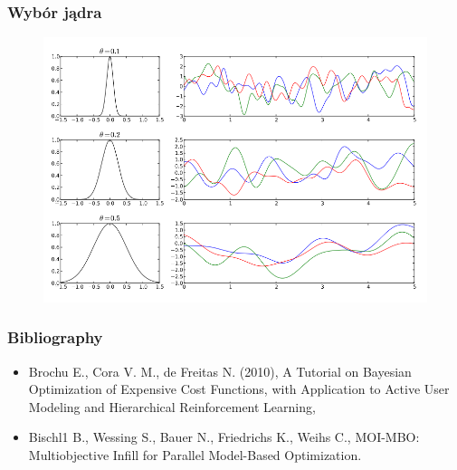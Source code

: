 \documentclass[handout]{beamer}
\begin{document}
\begin{frame}
\frametitle{Wybór jądra}
\begin{center}
\begin{figure}
\includegraphics[scale=0.45]{kern.png}
\end{figure}
\end{center}
\end{frame}

\begin{frame}
	\frametitle{Bibliography}
	\begin{itemize}
	    \item Brochu E., Cora V. M., de Freitas N. (2010), A Tutorial on Bayesian Optimization of
Expensive Cost Functions, with Application to
Active User Modeling and Hierarchical
Reinforcement Learning,

		\item Bischl1 B., Wessing S., Bauer N., Friedrichs K., Weihs C., MOI-MBO: Multiobjective Infill for Parallel
Model-Based Optimization.
	\end{itemize}
\end{frame}
\end{document}

